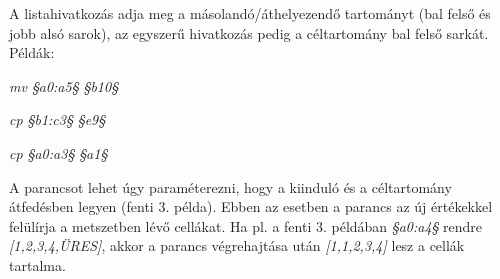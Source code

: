 A listahivatkozás adja meg a másolandó/áthelyezendő tartományt (bal felső és jobb alsó sarok), az egyszerű hivatkozás pedig a céltartomány bal felső sarkát. Példák:
\begin{compactenum}
	\item \textit{mv §a0:a5§ §b10§}
	\item \textit{cp §b1:c3§ §e9§}
	\item \textit{cp §a0:a3§ §a1§}
\end{compactenum}

A parancsot lehet úgy paraméterezni, hogy a kiinduló és a céltartomány átfedésben legyen (fenti 3. példa). Ebben az esetben a parancs az új értékekkel felülírja a metszetben lévő cellákat. Ha pl. a fenti 3. példában \textit{§a0:a4§} rendre \textit{[1,2,3,4,ÜRES]}, akkor a parancs végrehajtása után \textit{[1,1,2,3,4]} lesz a cellák tartalma.